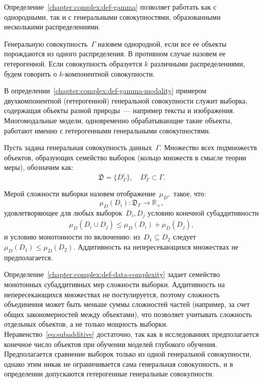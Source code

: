 Определение~\ref{chapter:complex:def-gamma} позволяет работать как с однородными, так и с генеральными совокупностями, образованными несколькими распределениями.

\begin{definition}\label{chapter:complex:def-gamma-modality}
    Генеральную совокупность~$\Gamma$ назовем однородной, если все ее объекты порождаются из одного распределения. В противном случае назовем ее гетерогенной. Если совокупность образуется $k$ различными распределениями, будем говорить о $k$-компонентной совокупности.
\end{definition}

В определении~\ref{chapter:complex:def-gamma-modality} примером двухкомпонентной (гетерогенной) генеральной совокупности служит выборка, содержащая объекты разной природы~--- например тексты и изображения. Многомодальные модели, одновременно обрабатывающие такие объекты, работают именно с гетерогенными генеральными совокупностями.

Пусть задана генеральная совокупность данных~$\Gamma$. Множество всех подмножеств объектов, образующих семейство выборок (кольцо множеств в смысле теории меры), обозначим как:
\[
    \mathfrak{D} = \{D_\Gamma^i\}, \quad D_\Gamma^i \subset \Gamma.
\]

\begin{definition}\label{chapter:complex:def-data-complexity}
    Мерой сложности выборки назовем отображение~$\mu_D,$ такое, что:
    \[
        \mu_D(D_i) : \mathfrak{D}_\Gamma \to \mathbb{R}_+,
    \]
    удовлетворяющее для любых выборок~$D_i, D_j$ условию конечной субаддитивности
    \begin{align}
        \mu_D(D_i\cup D_j) \leq \mu_D(D_i)+\mu_D(D_j),\label{eq:subadditive}
    \end{align}
    и условию монотонности по включению: из~$D_1 \subseteq D_2$ следует~$\mu_D(D_1)\leq\mu_D(D_2)$. Аддитивность на непересекающихся множествах не предполагается.
\end{definition}

Определение~\ref{chapter:complex:def-data-complexity} задает семейство монотонных субаддитивных мер сложности выборки. Аддитивность на непересекающихся множествах не постулируется, поэтому сложность объединения может быть меньше суммы сложностей частей (например, за счет общих закономерностей между объектами), что позволяет учитывать сложность отдельных объектов, а не только мощность выборки. Неравенство~\eqref{eq:subadditive} достаточно, так как в исследованиях предполагается конечное число объектов при обучении моделей глубокого обучения.
Предполагается сравнение выборок только из одной генеральной совокупности, однако этим никак не ограничивается сама генеральная совокупность, и в определении допускаются гетерогенные генеральные совокупности.

